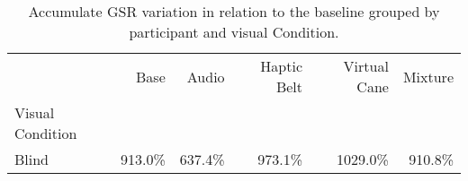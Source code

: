 
\begin{table}[!htb]
\centering
\caption{Accumulate GSR variation in relation to the baseline grouped by participant and visual Condition.}
\label{tab:gsr_var_sum_def_blind}
\begin{tabular}{lrrrrr}
\toprule
{} &     Base &    Audio & Haptic Belt & Virtual Cane &  Mixture \\
Visual Condition &          &          &             &              &          \\
\midrule
Blind            &  913.0\% &  637.4\% &     973.1\% &     1029.0\% &  910.8\% \\
\bottomrule
\end{tabular}
\end{table}

